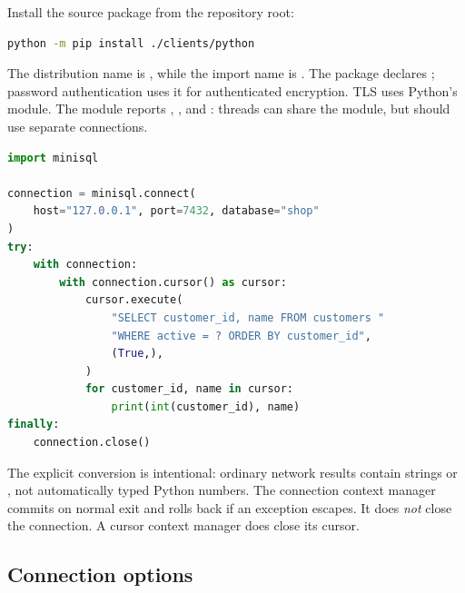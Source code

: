 Install the source package from the repository root:

\begin{lstlisting}[language=bash]
python -m pip install ./clients/python
\end{lstlisting}

The distribution name is , while the import name is . The package declares ; password authentication uses it for authenticated encryption. TLS uses Python's  module. The module reports , , and : threads can share the module, but should use separate connections.

\begin{lstlisting}[language=Python]
import minisql

connection = minisql.connect(
    host="127.0.0.1", port=7432, database="shop"
)
try:
    with connection:
        with connection.cursor() as cursor:
            cursor.execute(
                "SELECT customer_id, name FROM customers "
                "WHERE active = ? ORDER BY customer_id",
                (True,),
            )
            for customer_id, name in cursor:
                print(int(customer_id), name)
finally:
    connection.close()
\end{lstlisting}

The explicit  conversion is intentional: ordinary network results contain strings or , not automatically typed Python numbers. The connection context manager commits on normal exit and rolls back if an exception escapes. It does \emph{not} close the connection. A cursor context manager does close its cursor.

\subsection{Connection options}

